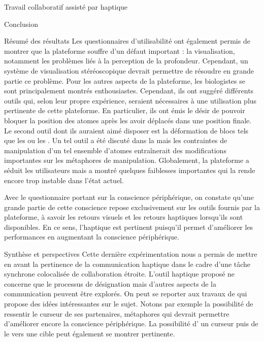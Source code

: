 \documentclass[myfrancais,ngerman,english,frenchb]{mythesis}
\begin{document}
\begin{mychapter}{Travail collaboratif assisté par haptique}
\begin{mysection}{Conclusion}
\begin{mysubsection}{Résumé des résultats}
				Les questionnaires d'utilisabilité ont également permis de montrer que la plateforme souffre d'un défaut important : la visualisation, notamment les problèmes liés à la perception de la profondeur.
				Cependant, un système de visualisation stéréoscopique devrait permettre de résoudre en grande partie ce problème.
				Pour les autres aspects de la plateforme, les biologistes se sont principalement montrés enthousiastes.
				Cependant, ils ont suggéré différents outils qui, selon leur propre expérience, seraient nécessaires à une utilisation plus pertinente de cette plateforme.
				En particulier, ils ont émis le désir de pouvoir bloquer la position des atomes après les avoir déplacés dans une position finale.
				Le second outil dont ils auraient aimé disposer est la déformation de blocs tels que les \myhelice* ou les \myfeuillet*.
				Un tel outil a été discuté dans la  mais les contraintes de manipulation d'un tel ensemble d'atomes entraînerait des modifications importantes sur les métaphores de manipulation.
				Globalement, la plateforme a séduit les utilisateurs mais a montré quelques faiblesses importantes qui la rende encore trop instable dans l'état actuel.

				Avec le questionnaire portant sur la conscience périphérique, on constate qu'une grande partie de cette conscience repose exclusivement sur les outils fournis par la plateforme, à savoir les retours visuels et les retours haptiques lorsqu'ils sont disponibles.
				En ce sens, l'haptique est pertinent puisqu'il permet d'améliorer les performances en augmentant la conscience périphérique.
			\end{mysubsection}
			\begin{mysubsection}{Synthèse et perspectives}
				Cette dernière expérimentation nous a permis de mettre en avant la pertinence de la communication haptique dans le cadre d'une tâche synchrone colocalisée de collaboration étroite.
				L'outil haptique proposé ne concerne que le processus de désignation mais d'autres aspects de la communication peuvent être explorés.
				On peut se reporter aux travaux de  qui propose des idées intéressantes sur le sujet.
				Notons par exemple la possibilité de ressentir le curseur de ses partenaires, métaphores qui devrait permettre d'améliorer encore la conscience périphérique.
				La possibilité d' un curseur puis de le  vers une cible peut également se montrer pertinente.


\end{mysubsection}
\end{mysection}
\end{mychapter}
\end{document}
